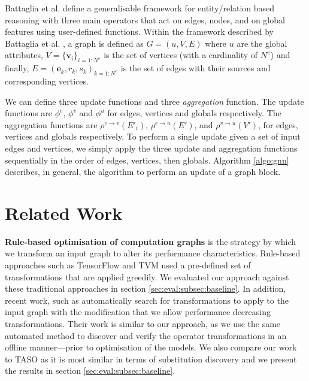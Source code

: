 Battaglia et al. \cite{battaglia2018relational} define a generalisable framework for entity/relation based reasoning with three main operators that act on edges, nodes, and on global features using user-defined functions. Within the framework described by Battaglia et al. \cite{battaglia2018relational}, a graph is defined as $G = (u, V, E)$ where $u$ are the global attributes, $V = \lbrace \mathbf{v}_i \rbrace_{i={1:N^v}}$ is the set of vertices (with a cardinality of $N^v$) and finally, $E = {(\mathbf{e}_k, r_k, s_k)}_{k={1:N^e}}$ is the set of edges with their sources and corresponding vertices.



We can define three update functions and three \textit{aggregation} function. The update functions are $\phi^e$, $\phi^v$ and $\phi^u$ for edges, vertices and globals respectively. The aggregation functions are $\rho^{e \rightarrow v} (E'_i)$, $\rho^{e \rightarrow u} (E')$, and $\rho^{v \rightarrow u} (V')$, for edges, vertices and globals respectively. To perform a single update given a set of input edges and vertices, we simply apply the three update and aggregation functions sequentially in the order of edges, vertices, then globals. Algorithm \ref{algo:gnn} describes, in general, the algorithm to perform an update of a graph block.



\section{Related Work}

\textbf{Rule-based optimisation of computation graphs} is the strategy by which we transform an input graph to alter its performance characteristics. Rule-based approaches such as TensorFlow \cite{tensorflow2015-whitepaper} and TVM \cite{chen2018tvm} used a pre-defined set of transformations that are applied greedily. We evaluated our approach against these traditional approaches in section \ref{sec:eval:subsec:baseline}. In addition, recent work, such as \cite{jia2019optimizing,jia2019taso} automatically search for transformations to apply to the input graph with the modification that we allow performance decreasing transformations. Their work is similar to our approach, as we use the same automated method to discover and verify the operator transformations in an offline manner---prior to optimisation of the models. We also compare our work to TASO \cite{jia2019taso} as it is most similar in terms of substitution discovery and we present the results in section \ref{sec:eval:subsec:baseline}.

